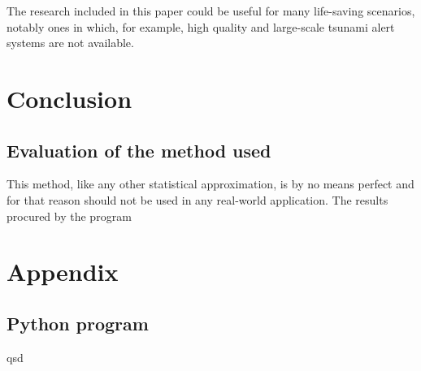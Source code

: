 \documentclass[11pt,letterpaper]{article}
\begin{document}
The research included in this paper could be useful for many life-saving scenarios, 
notably ones in which, for example, high quality and large-scale tsunami alert 
systems are not available. 

\section{Conclusion}

\subsection{Evaluation of the method used}

This method, like any other statistical approximation, is by no means perfect 
and for that reason should not be used in any real-world application. The results 
procured by the program 

\printbibliography[heading=bibintoc, title=Works Cited]

\appendix
\section{Appendix}
\label{app}
\subsection{Python program}
\label{app:scripts}
qsd

\end{document}
